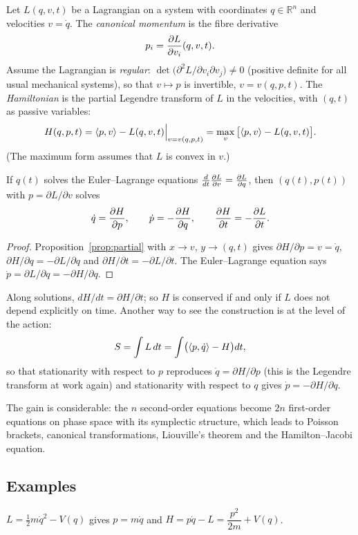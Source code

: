 Let $L(q,v,t)$ be a Lagrangian on a system with coordinates $q\in\mathbb{R}^n$ and
velocities $v=\dot q$.  The \emph{canonical momentum} is the fibre derivative
\[
  p_i=\frac{\partial L}{\partial v_i}(q,v,t).
\]
Assume the Lagrangian is \emph{regular}: $\det\bigl(\partial^2L/\partial v_i\partial v_j\bigr)\neq0$
(positive definite for all usual mechanical systems), so that $v\mapsto p$ is
invertible, $v=v(q,p,t)$.  The \emph{Hamiltonian} is the partial Legendre
transform of $L$ in the velocities, with $(q,t)$ as passive variables:
\[
  H(q,p,t)=\langle p,v\rangle-L(q,v,t)\Big|_{v=v(q,p,t)}=\max_v\,\bigl[\langle p,v\rangle-L(q,v,t)\bigr].
\]
(The maximum form assumes that $L$ is convex in $v$.)

\begin{theorem}
If $q(t)$ solves the Euler--Lagrange equations
$\frac{d}{d t}\frac{\partial L}{\partial v}=\frac{\partial L}{\partial q}$, then $(q(t),p(t))$ with
$p=\partial L/\partial v$ solves
\[
  \dot q=\frac{\partial H}{\partial p},\qquad \dot p=-\frac{\partial H}{\partial q},\qquad
  \frac{\partial H}{\partial t}=-\frac{\partial L}{\partial t}.
\]
\end{theorem}

\begin{proof}
Proposition~\ref{prop:partial} with $x\to v$, $y\to(q,t)$ gives
$\partial H/\partial p=v=\dot q$, $\partial H/\partial q=-\partial L/\partial q$
and $\partial H/\partial t=-\partial L/\partial t$.  The Euler--Lagrange equation
says $\dot p=\partial L/\partial q=-\partial H/\partial q$.
\end{proof}

Along solutions, $d H/d t=\partial H/\partial t$; so $H$ is conserved if
and only if $L$ does not depend explicitly on time.  Another way to see the
construction is at the level of the action:
\[
  S=\int L\,d t=\int\bigl(\langle p,\dot q\rangle-H\bigr)d t,
\]
so that stationarity with respect to $p$ reproduces $\dot q=\partial H/\partial p$
(this is the Legendre transform at work again) and stationarity with respect
to $q$ gives $\dot p=-\partial H/\partial q$.

The gain is considerable: the $n$ second-order equations become $2n$
first-order equations on phase space with its symplectic structure, which
leads to Poisson brackets, canonical transformations, Liouville's theorem and
the Hamilton--Jacobi equation.

\subsection{Examples}

\begin{example}
$L=\tfrac12m\dot q^2-V(q)$ gives $p=m\dot q$ and
$H=p\dot q-L=\dfrac{p^2}{2m}+V(q)$.
\end{example}

